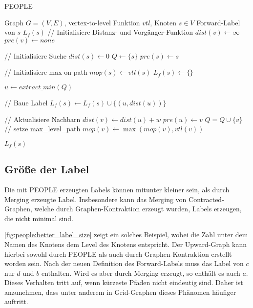 \begin{algorithm}[p]
  \caption{PEOPLE}
  \begin{algorithmic}[1]
    \Require Graph $G = (V, E)$, vertex-to-level Funktion ${vtl}$, Knoten $s \in V$
    \Ensure Forward-Label von $s$ $L_f (s)$
    \State // Initialisiere Distanz- und Vorgänger-Funktion
    \State ${dist}(v) \leftarrow \infty$
    \State ${pre}(v) \leftarrow {none}$
    \EndFor

    \State
    \State // Initialisiere Suche
    \State ${dist}(s) \leftarrow 0$
    \State $Q\leftarrow \{ s \}$
    \State ${pre}(s) \leftarrow s$

    \State
    \State // Initialisiere max-on-path
    \State ${mop}(s) \leftarrow {vtl}(s)$
    \State $L_f (s) \leftarrow \{ \}$

    \State
    \State $u \leftarrow{extract\_min}(Q)$

    \State
    \State // Baue Label
    \State $L_f (s) \leftarrow L_f (s) \cup \{ (u, {dist}(u)) \}$
    \EndIf

    \State
    \State // Aktualisiere Nachbarn
    \State ${dist}(v) \leftarrow {dist}(u) + w$
    \State ${pre}(u) \leftarrow v$
    \State $Q = Q \cup \{ v \}$
    \State
    \State // setze max\_level\_path
    \State ${mop}(v) \leftarrow \max({mop}(v), {vtl}(v))$
    \EndIf
    \EndFor

    \EndWhile

    \State
    \State \Return $L_f (s)$
  \end{algorithmic}
  \label{alg:people:people}
\end{algorithm}

\subsection{Größe der Label}\label{subsection:people:label_size}

Die mit PEOPLE erzeugten Labels können mitunter kleiner sein, als durch Merging erzeugte Label.
Insbesondere kann das Merging von Contracted-Graphen, welche durch Graphen-Kontraktion erzeugt wurden, Labels erzeugen, die nicht minimal sind.

\autoref{fig:people:better_label_size} zeigt ein solches Beispiel, wobei die Zahl unter dem Namen des Knotens dem Level des Knotens entspricht.
Der Upward-Graph kann hierbei sowohl durch PEOPLE als auch durch Graphen-Kontraktion erstellt worden sein.
Nach der neuen Definition des Forward-Labels muss das Label von $c$ nur $d$ und $b$ enthalten.
Wird es aber durch Merging erzeugt, so enthält es auch $a$.
Dieses Verhalten tritt auf, wenn kürzeste Pfaden nicht eindeutig sind.
Daher ist anzunehmen, dass unter anderem in Grid-Graphen dieses Phänomen häufiger auftritt.

